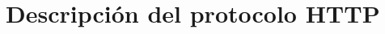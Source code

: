 

                                                        







\section{Descripción del protocolo HTTP}
\label{sec:Descripción del protocolo HTTP}

